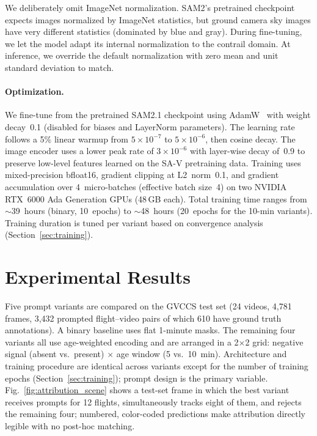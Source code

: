 \documentclass[1p,11pt]{elsarticle}
\begin{document}
We deliberately omit ImageNet normalization. SAM2's pretrained checkpoint expects images normalized by ImageNet statistics, but ground camera sky images have very different statistics (dominated by blue and gray). During fine-tuning, we let the model adapt its internal normalization to the contrail domain. At inference, we override the default normalization with zero mean and unit standard deviation to match.

\paragraph{Optimization.} We fine-tune from the pretrained SAM2.1 checkpoint using AdamW~\cite{loshchilov2019adamw} with weight decay~0.1 (disabled for biases and LayerNorm parameters). The learning rate follows a 5\% linear warmup from $5 \times 10^{-7}$ to $5 \times 10^{-6}$, then cosine decay. The image encoder uses a lower peak rate of $3 \times 10^{-6}$ with layer-wise decay of~0.9 to preserve low-level features learned on the SA-V pretraining data. Training uses mixed-precision bfloat16, gradient clipping at L2~norm~0.1, and gradient accumulation over 4~micro-batches (effective batch size~4) on two NVIDIA RTX~6000 Ada Generation GPUs (48\,GB each). Total training time ranges from $\sim$39~hours (binary, 10~epochs) to $\sim$48~hours (20~epochs for the 10-min variants). Training duration is tuned per variant based on convergence analysis (Section~\ref{sec:training}).

\section{Experimental Results}
\label{sec:results}

Five prompt variants are compared on the GVCCS test set (24 videos, 4,781 frames, 3,432 prompted flight--video pairs of which 610 have ground truth annotations). A binary baseline uses flat 1-minute masks. The remaining four variants all use age-weighted encoding and are arranged in a 2$\times$2 grid: negative signal (absent vs.\ present) $\times$ age window (5 vs.\ 10~min). Architecture and training procedure are identical across variants except for the number of training epochs (Section~\ref{sec:training}); prompt design is the primary variable. Fig.~\ref{fig:attribution_scene} shows a test-set frame in which the best variant receives prompts for 12 flights, simultaneously tracks eight of them, and rejects the remaining four; numbered, color-coded predictions make attribution directly legible with no post-hoc matching.
\end{document}

